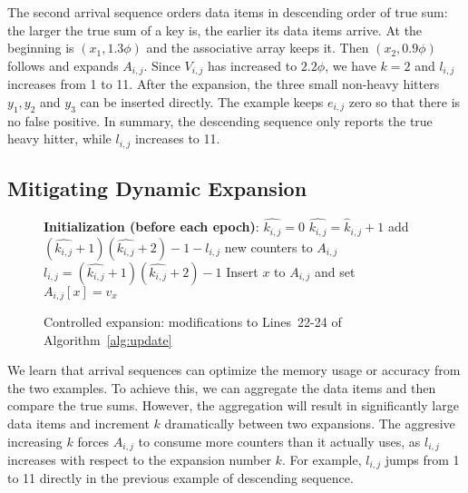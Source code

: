 The second arrival sequence orders data items in descending order of true sum:
the larger the true sum of a key is, the earlier its data items arrive.
At the beginning is $(x_1, 1.3\phi)$ and the associative array keeps it.
Then $(x_2, 0.9\phi)$ follows and expands $A_{i,j}$.
Since $V_{i,j}$ has increased to $2.2\phi$,
we have $k=2$ and $l_{i,j}$ increases from 1 to 11.
After the expansion, the three small non-heavy hitters $y_1, y_2$ and $y_3$ can be inserted directly.
The example keeps $e_{i,j}$ zero so that there is no false positive.
In summary, the descending sequence only reports the true heavy hitter,
while $l_{i,j}$ increases to 11.

\subsection{Mitigating Dynamic Expansion}
\label{sec:new_modify}

\begin{figure}[t]
\hrulefill
\begin{small}
\begin{algorithmic}[1]
\item[{\bf Initialization (before each epoch)}: $\hat{k_{i,j}}=0$]
\State $\hat{k_{i,j}}=\hat{k}_{i,j}+1$
\State add $(\hat{k_{i,j}}+1)(\hat{k_{i,j}}+2)-1 - l_{i,j}$ new counters to $A_{i,j}$
\State $l_{i,j} = (\hat{k_{i,j}}+1)(\hat{k_{i,j}}+2)-1$
\State Insert $x$ to $A_{i,j}$ and set $A_{i,j}[x] = v_x$
\end{algorithmic}
\end{small}
\vspace{-0.5em}
\hrulefill
\caption{Controlled expansion: modifications to Lines~22-24 of
Algorithm~\ref{alg:update}}
\label{fig:modification}
\end{figure}

We learn that arrival sequences can optimize the memory usage or accuracy from the two examples.
To achieve this, we can aggregate the data items and then compare the true sums.
However, the aggregation will result in significantly large data items and increment $k$ dramatically between two expansions.
The aggresive increasing $k$ forces $A_{i,j}$ to consume more counters than it actually uses,
as $l_{i,j}$ increases with respect to the expansion number $k$.
For example, $l_{i,j}$ jumps from 1 to 11 directly in the previous example of descending sequence.


